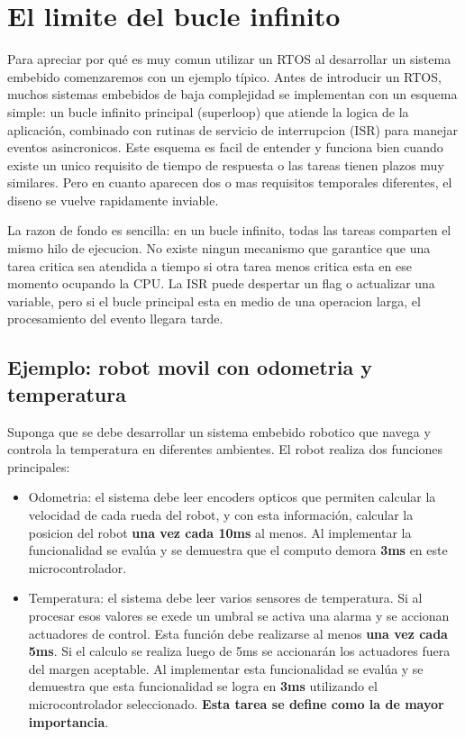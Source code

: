 \documentclass[output=paper, 
colorlinks,
citecolor=brown,
newtxmath
]{langscibook}
\begin{document}
\section{El limite del bucle infinito}

Para apreciar por qué es muy comun utilizar un RTOS al desarrollar un sistema embebido
comenzaremos con un ejemplo típico.
		Antes de introducir un RTOS, muchos sistemas embebidos de baja complejidad se implementan con un esquema simple: un bucle infinito principal (superloop) que atiende la logica de la aplicación, combinado con rutinas de servicio de interrupcion (ISR) para manejar eventos asincronicos. Este esquema es facil de entender y funciona bien cuando existe un unico requisito de tiempo de respuesta o las tareas tienen plazos muy similares. Pero en cuanto aparecen dos o mas requisitos temporales diferentes, el diseno se vuelve rapidamente inviable.

La razon de fondo es sencilla: en un bucle infinito, todas las tareas comparten el mismo hilo de ejecucion. No existe ningun mecanismo que garantice que una tarea critica sea atendida a tiempo si otra tarea menos critica esta en ese momento ocupando la CPU. La ISR puede despertar un flag o actualizar una variable, pero si el bucle principal esta en medio de una operacion larga, el procesamiento del evento llegara tarde.

\subsection{Ejemplo: robot movil con odometria y temperatura}

Suponga que se debe desarrollar un sistema embebido robotico que navega y controla la temperatura en diferentes ambientes.
El robot realiza dos funciones principales:

\begin{itemize}
	\item Odometria: el sistema debe leer encoders opticos que permiten calcular la velocidad de cada rueda del robot, y con esta información, calcular la posicion del robot \textbf{una vez cada 10ms} al menos.
Al implementar la funcionalidad se evalúa y se demuestra que el computo demora \textbf{3ms} en este microcontrolador. 
	\item Temperatura: el sistema debe leer varios sensores de temperatura. Si al procesar esos valores se exede un umbral se activa una alarma y se accionan actuadores de control. Esta función debe realizarse al menos \textbf{una vez cada 5ms}. Si el calculo se realiza luego de 5ms se accionarán los actuadores fuera del margen aceptable.  Al implementar esta funcionalidad se evalúa y se demuestra que esta funcionalidad se logra en \textbf{3ms} utilizando el microcontrolador seleccionado.
		\textbf{Esta tarea se define como la de mayor importancia}.
\end{itemize}
\end{document}
